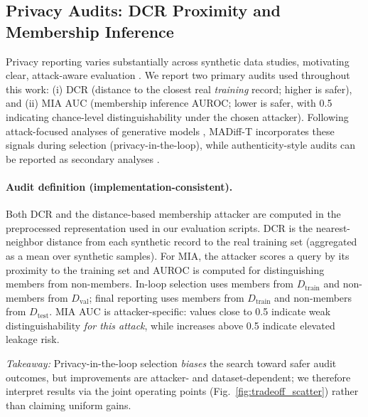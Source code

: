 \documentclass[preprint,12pt]{elsarticle}
\begin{document}
\subsection{Privacy Audits: DCR Proximity and Membership Inference}\label{sec:results_privacy}
Privacy reporting varies substantially across synthetic data studies, motivating clear, attack-aware evaluation \cite{Kindji2025, Hernandez2025, Hyrup2025}. We report two primary audits used throughout this work:
(i) DCR (distance to the closest real \emph{training} record; higher is safer), and
(ii) MIA AUC (membership inference AUROC; lower is safer, with 0.5 indicating chance-level distinguishability under the chosen attacker).
Following attack-focused analyses of generative models \cite{Hayes2019, ZhangMalin2022, Alshantti2025}, MADiff-T incorporates these signals during selection (privacy-in-the-loop), while authenticity-style audits can be reported as secondary analyses \cite{Alaa2022}.

\paragraph{Audit definition (implementation-consistent).}
Both DCR and the distance-based membership attacker are computed in the preprocessed representation used in our evaluation scripts. DCR is the nearest-neighbor distance from each synthetic record to the real training set (aggregated as a mean over synthetic samples). For MIA, the attacker scores a query by its proximity to the training set and AUROC is computed for distinguishing members from non-members. In-loop selection uses members from $D_{\text{train}}$ and non-members from $D_{\text{val}}$; final reporting uses members from $D_{\text{train}}$ and non-members from $D_{\text{test}}$. MIA AUC is attacker-specific: values close to 0.5 indicate weak distinguishability \emph{for this attack}, while increases above 0.5 indicate elevated leakage risk.

\noindent\textit{Takeaway:} Privacy-in-the-loop selection \emph{biases} the search toward safer audit outcomes, but improvements are attacker- and dataset-dependent; we therefore interpret results via the joint operating points (Fig.~\ref{fig:tradeoff_scatter}) rather than claiming uniform gains.
\end{document}
